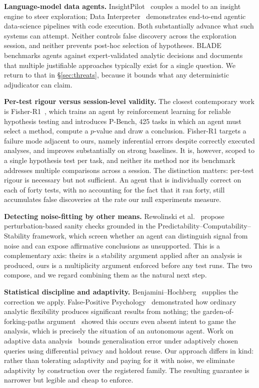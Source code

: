 \documentclass[10pt,twocolumn]{article}
\newcommand{\phead}[1]{\smallskip\noindent\textbf{#1.}\hspace{0.6em}\ignorespaces}
\begin{document}
\phead{Language-model data agents}
InsightPilot~\cite{ma2023} couples a model to an insight engine to steer
exploration; Data Interpreter~\cite{hong2024} demonstrates end-to-end agentic
data-science pipelines with code execution. Both substantially advance what such
systems can attempt. Neither controls false discovery across the exploration
session, and neither prevents post-hoc selection of hypotheses.
BLADE~\cite{gu2024blade} benchmarks agents against expert-validated analytic
decisions and documents that multiple justifiable approaches typically exist for
a single question. We return to that in \S\ref{sec:threats}, because it bounds
what any deterministic adjudicator can claim.

\phead{Per-test rigour versus session-level validity}
The closest contemporary work is Fisher-R1~\cite{miao2026fisher}, which trains
an agent by reinforcement learning for reliable hypothesis testing and
introduces P-Bench, 425 tasks in which an agent must select a method, compute a
$p$-value and draw a conclusion. Fisher-R1 targets a failure mode adjacent to
ours, namely inferential errors despite correctly executed analyses, and
improves substantially on strong baselines. It is, however, scoped to a single
hypothesis test per task, and neither its method nor its benchmark addresses
multiple comparisons across a session. The distinction matters: per-test rigour
is necessary but not sufficient. An agent that is individually correct on each
of forty tests, with no accounting for the fact that it ran forty, still
accumulates false discoveries at the rate our null experiments measure.

\phead{Detecting noise-fitting by other means}
Rewolinski et al.~\cite{rewolinski2026sanity} propose perturbation-based sanity
checks grounded in the Predictability--Computability--Stability framework, which
screen whether an agent can distinguish signal from noise and can expose
affirmative conclusions as unsupported. This is a complementary axis: theirs is
a stability argument applied after an analysis is produced, ours is a
multiplicity argument enforced before any test runs. The two compose, and we
regard combining them as the natural next step.

\phead{Statistical discipline and adaptivity}
Benjamini--Hochberg~\cite{benjamini1995} supplies the correction we apply.
False-Positive Psychology~\cite{simmons2011} demonstrated how ordinary analytic
flexibility produces significant results from nothing; the garden-of-forking-paths
argument~\cite{gelman2014} showed this occurs even absent intent to game the
analysis, which is precisely the situation of an autonomous agent. Work on
adaptive data analysis~\cite{dwork2015} bounds generalisation error under
adaptively chosen queries using differential privacy and holdout reuse. Our
approach differs in kind: rather than tolerating adaptivity and paying for it
with noise, we eliminate adaptivity by construction over the registered family.
The resulting guarantee is narrower but legible and cheap to enforce.
\end{document}
